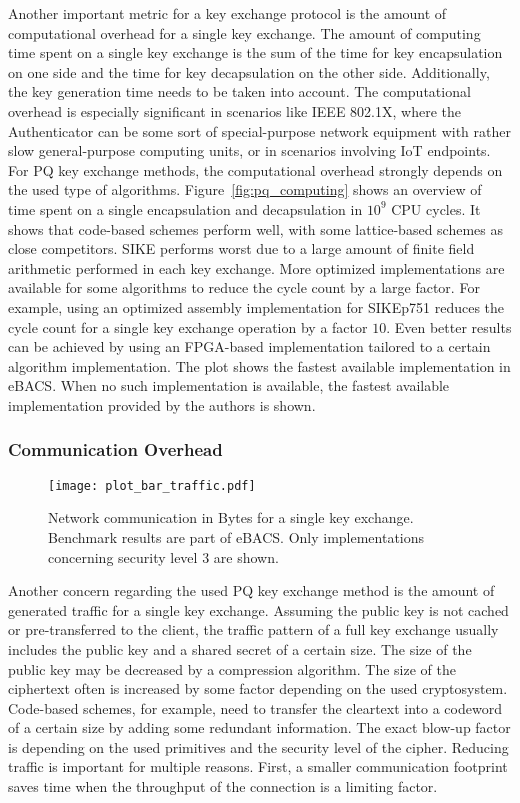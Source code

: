 Another important metric for a key exchange protocol is the amount of computational overhead for a single key exchange. The amount of computing time spent on a single key exchange is the sum of the time for key encapsulation on one side and the time for key decapsulation on the other side. Additionally, the key generation time needs to be taken into account. The computational overhead is especially significant in scenarios like IEEE 802.1X, where the Authenticator can be some sort of special-purpose network equipment with rather slow general-purpose computing units, or in scenarios involving \ac{IoT} endpoints. For \ac{PQ} key exchange methods, the computational overhead strongly depends on the used type of algorithms. Figure~\ref{fig:pq_computing} shows an overview of time spent on a single encapsulation and decapsulation in \(10^9\) CPU cycles. It shows that code-based schemes perform well, with some lattice-based schemes as close competitors. SIKE performs worst due to a large amount of finite field arithmetic performed in each key exchange. More optimized implementations are available for some algorithms to reduce the cycle count by a large factor. For example, using an optimized assembly implementation for SIKEp751 reduces the cycle count for a single key exchange operation by a factor \(10\). Even better results can be achieved by using an FPGA-based implementation tailored to a certain algorithm implementation. The plot shows the fastest available implementation in eBACS. When no such implementation is available, the fastest available implementation provided by the authors is shown.

\subsubsection{Communication Overhead}

\begin{figure}[ht]
    \centering\texttt{[image: plot\_bar\_traffic.pdf]}
    \caption{Network communication in Bytes for a single key exchange. Benchmark results are part of eBACS\cite{eBACS}. Only implementations concerning security level 3 are shown.}\label{fig:pq_traffic}
\end{figure}

Another concern regarding the used \ac{PQ} key exchange method is the amount of generated traffic for a single key exchange. Assuming the public key is not cached or pre-transferred to the client, the traffic pattern of a full key exchange usually includes the public key and a shared secret of a certain size. The size of the public key may be decreased by a compression algorithm. The size of the ciphertext often is increased by some factor depending on the used cryptosystem. Code-based schemes, for example, need to transfer the cleartext into a codeword of a certain size by adding some redundant information. The exact blow-up factor is depending on the used primitives and the security level of the cipher. Reducing traffic is important for multiple reasons. First, a smaller communication footprint saves time when the throughput of the connection is a limiting factor.

